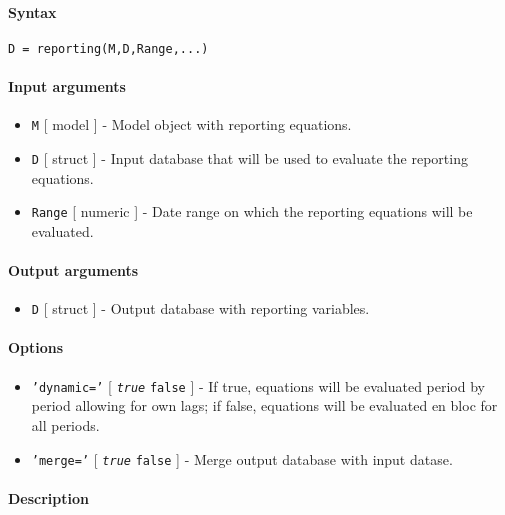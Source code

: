 


	\paragraph{Syntax}

\begin{verbatim}
D = reporting(M,D,Range,...)
\end{verbatim}

\paragraph{Input arguments}

\begin{itemize}
\item
  \texttt{M} {[} model {]} - Model object with reporting equations.
\item
  \texttt{D} {[} struct {]} - Input database that will be used to
  evaluate the reporting equations.
\item
  \texttt{Range} {[} numeric {]} - Date range on which the reporting
  equations will be evaluated.
\end{itemize}

\paragraph{Output arguments}

\begin{itemize}
\itemsep1pt\parskip0pt
\item
  \texttt{D} {[} struct {]} - Output database with reporting variables.
\end{itemize}

\paragraph{Options}

\begin{itemize}
\item
  \texttt{'dynamic='} {[} \emph{\texttt{true}} \textbar{} \texttt{false}
  {]} - If true, equations will be evaluated period by period allowing
  for own lags; if false, equations will be evaluated en bloc for all
  periods.
\item
  \texttt{'merge='} {[} \emph{\texttt{true}} \textbar{} \texttt{false}
  {]} - Merge output database with input datase.
\end{itemize}

\paragraph{Description}



